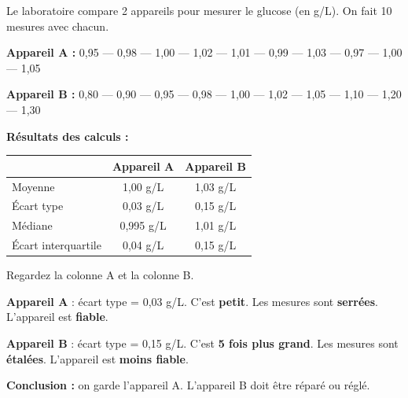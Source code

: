 \documentclass[12pt,a4paper]{article}
\begin{document}
\begin{exemple}
Le laboratoire compare 2 appareils pour mesurer le glucose (en g/L). On fait 10 mesures avec chacun.

\vspace{0.3cm}
\textbf{Appareil A :} 0,95 — 0,98 — 1,00 — 1,02 — 1,01 — 0,99 — 1,03 — 0,97 — 1,00 — 1,05

\vspace{0.2cm}
\textbf{Appareil B :} 0,80 — 0,90 — 0,95 — 0,98 — 1,00 — 1,02 — 1,05 — 1,10 — 1,20 — 1,30

\vspace{0.4cm}
\textbf{Résultats des calculs :}

\begin{center}
\renewcommand{\arraystretch}{1.5}
\begin{tabular}{|l|c|c|}
\hline
& \textbf{Appareil A} & \textbf{Appareil B} \\
\hline
Moyenne & 1,00 g/L & 1,03 g/L \\
\hline
Écart type & 0,03 g/L & 0,15 g/L \\
\hline
Médiane & 0,995 g/L & 1,01 g/L \\
\hline
Écart interquartile & 0,04 g/L & 0,15 g/L \\
\hline
\end{tabular}
\end{center}
\end{exemple}

\begin{enclair}
Regardez la colonne A et la colonne B.

\vspace{0.3cm}
\textbf{Appareil A} : écart type = 0,03 g/L. C'est \textbf{petit}. Les mesures sont \textbf{serrées}. L'appareil est \textbf{fiable}.

\vspace{0.3cm}
\textbf{Appareil B} : écart type = 0,15 g/L. C'est \textbf{5 fois plus grand}. Les mesures sont \textbf{étalées}. L'appareil est \textbf{moins fiable}.

\vspace{0.3cm}
\textbf{Conclusion :} on garde l'appareil A. L'appareil B doit être réparé ou réglé.
\end{enclair}
\end{document}
